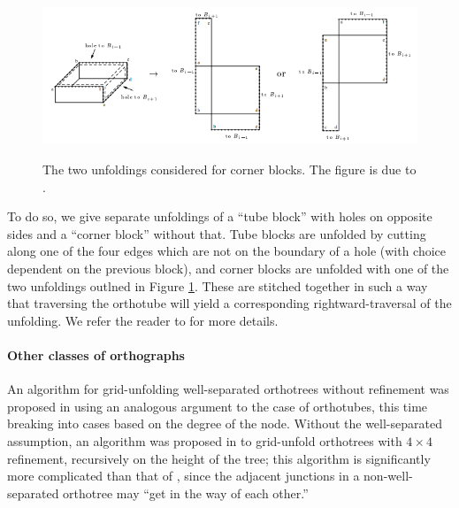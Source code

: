 \documentclass{article}
\begin{document}
\begin{figure}
  \begin{center}
    \includegraphics[width=.8\textwidth]{./figs/Corner_unfolding.png}\\
  \end{center}
  \caption{
    The two unfoldings considered for corner blocks.
    The figure is due to \cite[Fig. 11]{Biedl_Demaine}.
  }\label{Corner unfolding figure}
\end{figure}

To do so, we give separate unfoldings of a ``tube block'' with holes on opposite sides and a ``corner block'' without that.
Tube blocks are unfolded by cutting along one of the four edges which are not on the boundary of a hole (with choice dependent on the previous block), and corner blocks are unfolded with one of the two unfoldings outlned in Figure \ref{Corner unfolding figure}.
These are stitched together in such a way that traversing the orthotube will yield a corresponding rightward-traversal of the unfolding.
We refer the reader to \cite{Biedl_Demaine} for more details.
 
\paragraph{Other classes of orthographs}
An algorithm for grid-unfolding well-separated orthotrees without refinement was proposed in \cite{Damian_Flatland_Well_Separated} using an analogous argument to the case of orthotubes, this time breaking into cases based on the degree of the node. 
Without the well-separated assumption, an algorithm was proposed in \cite{Damian_Flatland_Better} to grid-unfold orthotrees with $4 \times 4$ refinement, recursively on the height of the tree;
this algorithm is significantly more complicated than that of \cite{Damian_Flatland_Well_Separated}, since the adjacent junctions in a non-well-separated orthotree may ``get in the way of each other.''
\end{document}
